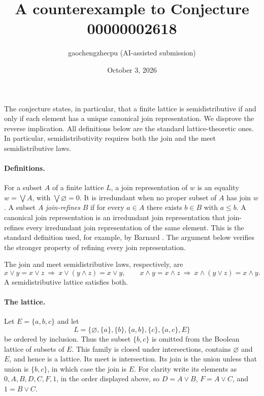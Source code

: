 \documentclass[11pt]{article}
\title{A counterexample to Conjecture 00000002618}
\author{gaochengzhecpu (AI-assisted submission)}
\date{October 3, 2026}
\begin{document}
\maketitle

The conjecture states, in particular, that a finite lattice is
semidistributive if and only if each element has a unique canonical join
representation. We disprove the reverse implication. All definitions below
are the standard lattice-theoretic ones. In particular, semidistributivity
requires both the join and the meet semidistributive laws.

\paragraph{Definitions.}
For a subset $A$ of a finite lattice $L$, a join representation of $w$ is
an equality $w=\bigvee A$, with $\bigvee\varnothing=0$.
It is irredundant when no proper subset of $A$ has join $w$.
A subset $A$ \emph{join-refines} $B$ if for every $a\in A$ there exists
$b\in B$ with $a\leq b$.
A canonical join representation is an irredundant join representation
that join-refines every irredundant join representation of the same
element. This is the standard definition used, for example, by Barnard
\cite{Barnard}. The argument below verifies the stronger property of
refining every join representation.

The join and meet semidistributive laws, respectively, are
\[
 x\vee y=x\vee z\ \Longrightarrow\
 x\vee(y\wedge z)=x\vee y,\qquad
 x\wedge y=x\wedge z\ \Longrightarrow\
 x\wedge(y\vee z)=x\wedge y.
\]
A semidistributive lattice satisfies both.

\paragraph{The lattice.}
Let $E=\{a,b,c\}$ and let
\[
 L=\{\varnothing,\{a\},\{b\},\{a,b\},\{c\},\{a,c\},E\}
\]
be ordered by inclusion. Thus the subset $\{b,c\}$ is omitted from the
Boolean lattice of subsets of $E$.
This family is closed under intersections, contains $\varnothing$ and
$E$, and hence is a lattice. Its meet is intersection. Its join is the
union unless that union is $\{b,c\}$, in which case the join is $E$.
For clarity write its elements as $0,A,B,D,C,F,1$, in the order displayed
above, so $D=A\vee B$, $F=A\vee C$, and $1=B\vee C$.
\end{document}
